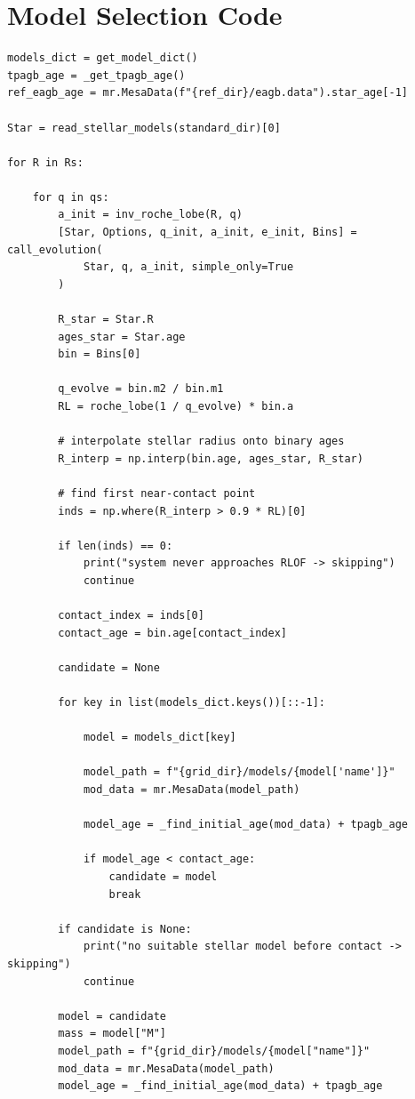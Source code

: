 \documentclass[a4paper,10pt]{article}
\begin{document}
\section{Model Selection Code}\label{app:select_model}
\begin{verbatim}
models_dict = get_model_dict()
tpagb_age = _get_tpagb_age()
ref_eagb_age = mr.MesaData(f"{ref_dir}/eagb.data").star_age[-1]

Star = read_stellar_models(standard_dir)[0]

for R in Rs:

    for q in qs:
        a_init = inv_roche_lobe(R, q)
        [Star, Options, q_init, a_init, e_init, Bins] = call_evolution(
            Star, q, a_init, simple_only=True
        )

        R_star = Star.R
        ages_star = Star.age
        bin = Bins[0]

        q_evolve = bin.m2 / bin.m1
        RL = roche_lobe(1 / q_evolve) * bin.a

        # interpolate stellar radius onto binary ages
        R_interp = np.interp(bin.age, ages_star, R_star)

        # find first near-contact point
        inds = np.where(R_interp > 0.9 * RL)[0]

        if len(inds) == 0:
            print("system never approaches RLOF -> skipping")
            continue

        contact_index = inds[0]
        contact_age = bin.age[contact_index]

        candidate = None

        for key in list(models_dict.keys())[::-1]:

            model = models_dict[key]

            model_path = f"{grid_dir}/models/{model['name']}"
            mod_data = mr.MesaData(model_path)

            model_age = _find_initial_age(mod_data) + tpagb_age

            if model_age < contact_age:
                candidate = model
                break

        if candidate is None:
            print("no suitable stellar model before contact -> skipping")
            continue

        model = candidate
        mass = model["M"]
        model_path = f"{grid_dir}/models/{model["name"]}"
        mod_data = mr.MesaData(model_path)
        model_age = _find_initial_age(mod_data) + tpagb_age


\end{verbatim}
\end{document}
